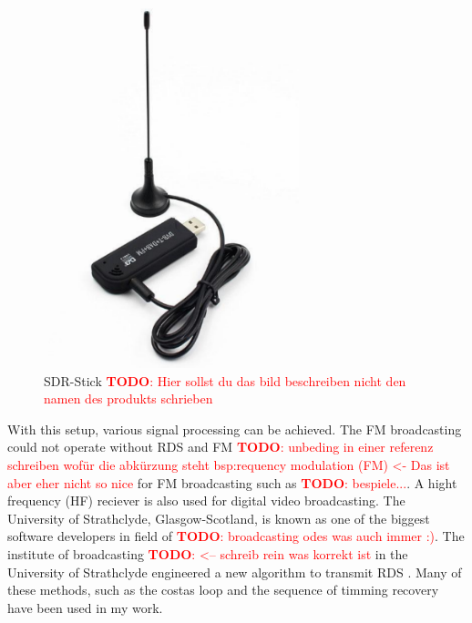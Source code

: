 \documentclass[conference,11pt,a4paper]{IEEEtran}
\newcommand{\todo}[1]{\textcolor{red}{\textbf{TODO}: #1}}
\begin{document}
		
		\begin{figure}[h]
			\centering
			\includegraphics[scale=0.63]{img/SDR-Stick}
			\caption{SDR-Stick \todo{Hier sollst du das bild beschreiben nicht den namen des produkts schrieben}}
			\label{fig: receiver}
		\end{figure}
	
		With this setup, various signal processing can be achieved. The FM broadcasting could not operate without RDS and FM \todo{unbeding in einer referenz schreiben wofür die abkürzung steht bsp:requency modulation (FM) <- Das ist aber eher nicht so nice} for FM broadcasting such as \todo{bespiele...}. A hight frequency (HF) reciever is also used for digital video broadcasting. The University of Strathclyde, Glasgow-Scotland, is known as one of the biggest software developers in field of \todo{broadcasting odes was auch immer :)}. The institute of broadcasting \todo{<-- schreib rein was korrekt ist} in the University of Strathclyde engineered a new algorithm to transmit RDS \cite{stewart2015software}. Many of these methods, such as the costas loop and the sequence of timming recovery have been used in my work.\\
		
		
		
		
		
		
		
		
		
		
		
		
		
		
		
\end{document}
